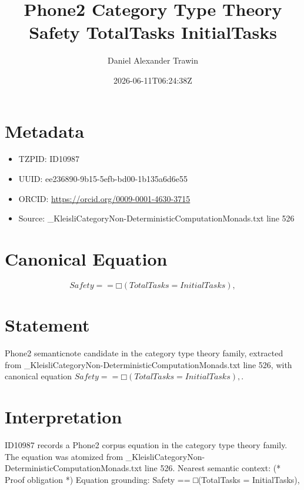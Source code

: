 \documentclass[11pt]{article}
\title{Phone2 Category Type Theory Safety TotalTasks InitialTasks}
\author{Daniel Alexander Trawin}
\date{2026-06-11T06:24:38Z}
\begin{document}
\maketitle
\section*{Metadata}
\begin{itemize}
\item TZPID: ID10987
\item UUID: ee236890-9b15-5efb-bd00-1b135a6d6e55
\item ORCID: \url{https://orcid.org/0009-0001-4630-3715}
\item Source: _KleisliCategoryNon-DeterministicComputationMonads.txt line 526
\end{itemize}
\section*{Canonical Equation}
\[
Safety == □(TotalTasks = InitialTasks),
\]
\section*{Statement}
Phone2 semanticnote candidate in the category type theory family, extracted from _KleisliCategoryNon-DeterministicComputationMonads.txt line 526, with canonical equation $Safety == □(TotalTasks = InitialTasks),$.
\section*{Interpretation}
ID10987 records a Phone2 corpus equation in the category type theory family. The equation was atomized from _KleisliCategoryNon-DeterministicComputationMonads.txt line 526. Nearest semantic context: (* Proof obligation *) Equation grounding: Safety == □(TotalTasks = InitialTasks),
\end{document}
